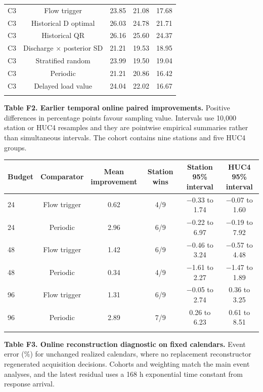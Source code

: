 \documentclass[lineno,pdflatex,sn-apa]{sn-jnl}%
\theoremstyle{thmstyleone}%
\theoremstyle{thmstyletwo}%
\theoremstyle{thmstylethree}%
\begin{document}
\begin{center}
\begin{tabular}{@{}lcccc@{}}
C3 & Flow trigger & 23.85 & 21.08 & 17.68\\
C3 & Historical D optimal & 26.03 & 24.78 & 21.71\\
C3 & Historical QR & 26.16 & 25.60 & 24.37\\
C3 & Discharge $\times$ posterior SD & 21.21 & 19.53 & 18.95\\
C3 & Stratified random & 23.99 & 19.50 & 19.04\\
C3 & Periodic & 21.21 & 20.86 & 16.42\\
C3 & Delayed load value & 24.04 & 22.02 & 16.67\\
\botrule
\end{tabular}
\end{center}

\textbf{Table F2. Earlier temporal online paired improvements.} Positive differences in percentage points favour sampling value. Intervals use 10,000 station or HUC4 resamples and they are pointwise empirical summaries rather than simultaneous intervals. The cohort contains nine stations and five HUC4 groups.

\begin{center}
\footnotesize
\setlength{\tabcolsep}{2pt}
\begin{tabular}{@{}lccccc@{}}
\toprule
Budget & Comparator & \shortstack{Mean\\improvement} & Station wins & \shortstack{Station 95\%\\interval} & \shortstack{HUC4 95\%\\interval}\\
\midrule
24 & Flow trigger & 0.62 & 4/9 & $-$0.33 to 1.74 & $-$0.07 to 1.60\\
24 & Periodic & 2.96 & 6/9 & $-$0.22 to 6.97 & $-$0.19 to 7.92\\
48 & Flow trigger & 1.42 & 6/9 & $-$0.46 to 3.24 & $-$0.57 to 4.48\\
48 & Periodic & 0.34 & 4/9 & $-$1.61 to 2.27 & $-$1.47 to 1.89\\
96 & Flow trigger & 1.31 & 6/9 & $-$0.05 to 2.74 & 0.36 to 3.25\\
96 & Periodic & 2.89 & 7/9 & 0.26 to 6.23 & 0.61 to 8.51\\
\botrule
\end{tabular}
\end{center}

\textbf{Table F3. Online reconstruction diagnostic on fixed calendars.} Event error (\%) for unchanged realized calendars, where no replacement reconstructor regenerated acquisition decisions. Cohorts and weighting match the main event analyses, and the latest residual uses a 168 h exponential time constant from response arrival.
\end{document}
